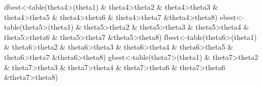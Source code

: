 \documentclass[
]{book}
\newenvironment{Shaded}{\begin{snugshade}}{\end{snugshade}}
\newcommand{\FunctionTok}[1]{\textcolor[rgb]{0.00,0.00,0.00}{#1}}
\newcommand{\NormalTok}[1]{#1}
\newcommand{\OtherTok}[1]{\textcolor[rgb]{0.56,0.35,0.01}{#1}}
\newcommand{\SpecialCharTok}[1]{\textcolor[rgb]{0.00,0.00,0.00}{#1}}
\theoremstyle{definition}
\theoremstyle{definition}
\theoremstyle{definition}
\theoremstyle{definition}
\theoremstyle{remark}
\begin{document}
\begin{Shaded}
\begin{Highlighting}[]
\NormalTok{  dbest}\OtherTok{\textless{}{-}}\FunctionTok{table}\NormalTok{(theta4}\SpecialCharTok{\textgreater{}}\NormalTok{(theta1) }\SpecialCharTok{\&}\NormalTok{ theta4}\SpecialCharTok{\textgreater{}}\NormalTok{theta2 }\SpecialCharTok{\&}\NormalTok{ theta4}\SpecialCharTok{\textgreater{}}\NormalTok{theta3 }\SpecialCharTok{\&}\NormalTok{ theta4}\SpecialCharTok{\textgreater{}}\NormalTok{theta5 }\SpecialCharTok{\&}\NormalTok{ theta4}\SpecialCharTok{\textgreater{}}\NormalTok{theta6 }\SpecialCharTok{\&}\NormalTok{ theta4}\SpecialCharTok{\textgreater{}}\NormalTok{theta7 }\SpecialCharTok{\&}\NormalTok{theta4}\SpecialCharTok{\textgreater{}}\NormalTok{theta8)}
\NormalTok{  ebest}\OtherTok{\textless{}{-}}\FunctionTok{table}\NormalTok{(theta5}\SpecialCharTok{\textgreater{}}\NormalTok{(theta1) }\SpecialCharTok{\&}\NormalTok{ theta5}\SpecialCharTok{\textgreater{}}\NormalTok{theta2 }\SpecialCharTok{\&}\NormalTok{ theta5}\SpecialCharTok{\textgreater{}}\NormalTok{theta3 }\SpecialCharTok{\&}\NormalTok{ theta5}\SpecialCharTok{\textgreater{}}\NormalTok{theta4 }\SpecialCharTok{\&}\NormalTok{ theta5}\SpecialCharTok{\textgreater{}}\NormalTok{theta6 }\SpecialCharTok{\&}\NormalTok{ theta5}\SpecialCharTok{\textgreater{}}\NormalTok{theta7 }\SpecialCharTok{\&}\NormalTok{theta5}\SpecialCharTok{\textgreater{}}\NormalTok{theta8)}
\NormalTok{  fbest}\OtherTok{\textless{}{-}}\FunctionTok{table}\NormalTok{(theta6}\SpecialCharTok{\textgreater{}}\NormalTok{(theta1) }\SpecialCharTok{\&}\NormalTok{ theta6}\SpecialCharTok{\textgreater{}}\NormalTok{theta2 }\SpecialCharTok{\&}\NormalTok{ theta6}\SpecialCharTok{\textgreater{}}\NormalTok{theta3 }\SpecialCharTok{\&}\NormalTok{ theta6}\SpecialCharTok{\textgreater{}}\NormalTok{theta4 }\SpecialCharTok{\&}\NormalTok{ theta6}\SpecialCharTok{\textgreater{}}\NormalTok{theta5 }\SpecialCharTok{\&}\NormalTok{ theta6}\SpecialCharTok{\textgreater{}}\NormalTok{theta7 }\SpecialCharTok{\&}\NormalTok{theta6}\SpecialCharTok{\textgreater{}}\NormalTok{theta8)}
\NormalTok{  gbest}\OtherTok{\textless{}{-}}\FunctionTok{table}\NormalTok{(theta7}\SpecialCharTok{\textgreater{}}\NormalTok{(theta1) }\SpecialCharTok{\&}\NormalTok{ theta7}\SpecialCharTok{\textgreater{}}\NormalTok{theta2 }\SpecialCharTok{\&}\NormalTok{ theta7}\SpecialCharTok{\textgreater{}}\NormalTok{theta3 }\SpecialCharTok{\&}\NormalTok{ theta7}\SpecialCharTok{\textgreater{}}\NormalTok{theta4 }\SpecialCharTok{\&}\NormalTok{ theta7}\SpecialCharTok{\textgreater{}}\NormalTok{theta6 }\SpecialCharTok{\&}\NormalTok{ theta7}\SpecialCharTok{\textgreater{}}\NormalTok{theta6 }\SpecialCharTok{\&}\NormalTok{theta7}\SpecialCharTok{\textgreater{}}\NormalTok{theta8)}

\end{Highlighting}
\end{Shaded}
\end{document}
